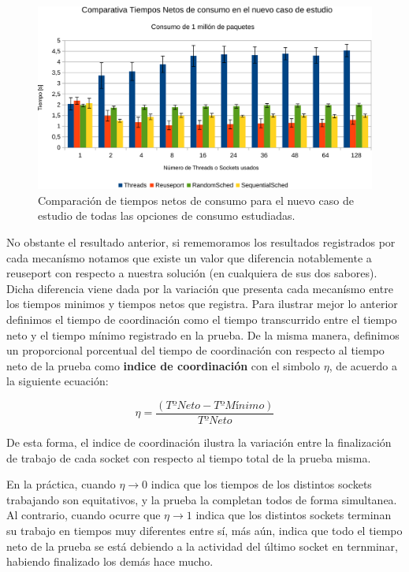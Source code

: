 \begin{figure}[!h]
	\centering
	\includegraphics[scale=.6]{resultados/modulovstodos1-crop.pdf}
	\caption{Comparación de tiempos netos de consumo para el nuevo caso de estudio de todas las opciones de consumo estudiadas.}
	\label{fig:resultadoMiModulovsTodos}
\end{figure}

No obstante el resultado anterior, si rememoramos los resultados registrados por cada mecanísmo notamos que existe un valor que diferencia notablemente a reuseport con respecto a nuestra solución (en cualquiera de sus dos sabores). Dicha diferencia viene dada por la variación que presenta cada mecanísmo entre los tiempos minimos y tiempos netos que registra. Para ilustrar mejor lo anterior definimos el tiempo de coordinación como el tiempo transcurrido entre el tiempo neto y el tiempo mínimo registrado en la prueba. De la misma manera, definimos un proporcional porcentual del tiempo de coordinación con respecto al tiempo neto de la prueba como \textbf{indice de coordinación} con el simbolo $\eta$, de acuerdo a la siguiente ecuación:

\begin{equation}
\eta = \frac{\left(Tº Neto - Tº Mínimo\right)}{Tº Neto}
\end{equation}

De esta forma, el indice de coordinación ilustra la variación entre la finalización de trabajo de cada socket con respecto al tiempo total de la prueba misma. 

En la práctica, cuando $\eta\rightarrow 0$ indica que los tiempos de los distintos sockets trabajando son equitativos, y la prueba la completan todos de forma simultanea. Al contrario, cuando ocurre que $\eta \rightarrow 1$ indica que los distintos sockets terminan su trabajo en tiempos muy diferentes entre sí, más aún, indica que todo el tiempo neto de la prueba se está debiendo a la actividad del último socket en ternminar, habiendo finalizado los demás hace mucho.

